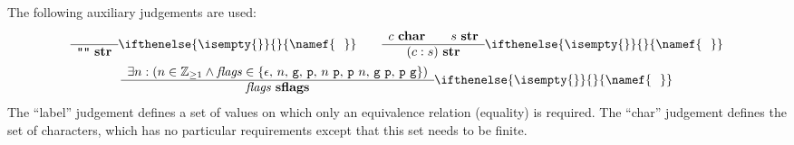 \documentclass[11pt]{article}
\newcommand{\ifempty}[3]{\ifthenelse{\isempty{#1}}{#2}{#3}}
\newcommand\RULE[3][]{\begin{array}{c} #2 \\ \hline #3 \end{array}\ifempty{#1}{}{\namef{\text{\ \ #1}}}}
\newcommand\J[1]{\ensuremath{\textbf{#1}}}
\newcommand\cmd[1]{\ensuremath{\text{\texttt{#1}}}}
\newcommand\code[1]{\ensuremath{\text{\texttt{#1}}}}
\renewcommand\arg[1]{\ensuremath{\mathit{#1}}}
\begin{document}
%
The following auxiliary judgements are used:
\begin{gather*}
	\RULE{}{\code{""}\ \J{str}} \qquad
	\RULE{c\ \J{char} \qquad s\ \J{str}}{(c : s)\ \J{str}} \\
	\RULE{\exists n : (n \in \mathbb{Z}_{\geq1} \land \arg{flags} \in \{\epsilon,\, n,\, \cmd{g},\, \cmd{p},\, n\ \cmd{p},\, \cmd{p}\ n,\, \cmd{g}\ \cmd{p},\, \cmd{p}\ \cmd{g}\})}{\arg{flags}\ \J{sflags}}
\end{gather*}
%
The ``label'' judgement defines a set of values on which only an equivalence relation (equality) is required.
The ``char'' judgement defines the set of characters, which has no particular requirements except that this set needs to be finite.
\end{document}

